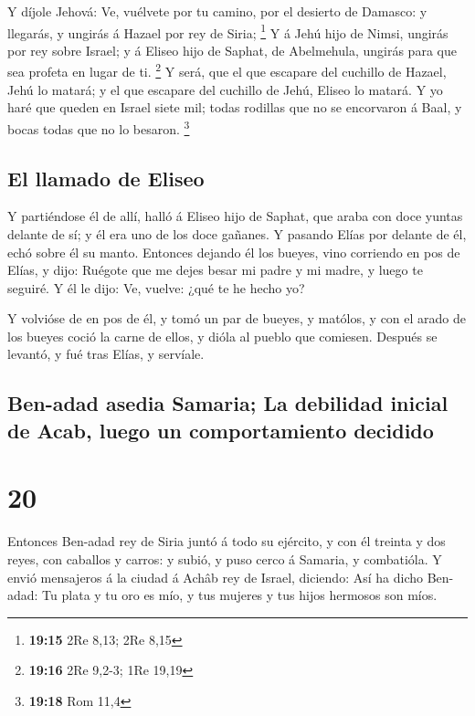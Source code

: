  Y díjole Jehová: Ve, vuélvete por tu camino, por el
desierto de Damasco: y llegarás, y ungirás á Hazael por rey de Siria;
\footnote{\textbf{19:15} 2Re 8,13; 2Re 8,15}  Y á Jehú
hijo de Nimsi, ungirás por rey sobre Israel; y á Eliseo hijo de Saphat,
de Abelmehula, ungirás para que sea profeta en lugar de ti. \footnote{\textbf{19:16}
  2Re 9,2-3; 1Re 19,19}  Y será, que el que escapare del
cuchillo de Hazael, Jehú lo matará; y el que escapare del cuchillo de
Jehú, Eliseo lo matará.  Y yo haré que queden en Israel
siete mil; todas rodillas que no se encorvaron á Baal, y bocas todas que
no lo besaron. \footnote{\textbf{19:18} Rom 11,4}

\hypertarget{el-llamado-de-eliseo}{%
\subsection{El llamado de Eliseo}\label{el-llamado-de-eliseo}}

 Y partiéndose él de allí, halló á Eliseo hijo de Saphat,
que araba con doce yuntas delante de sí; y él era uno de los doce
gañanes. Y pasando Elías por delante de él, echó sobre él su manto.
 Entonces dejando él los bueyes, vino corriendo en pos de
Elías, y dijo: Ruégote que me dejes besar mi padre y mi madre, y luego
te seguiré. Y él le dijo: Ve, vuelve: ¿qué te he hecho yo?

 Y volvióse de en pos de él, y tomó un par de bueyes, y
matólos, y con el arado de los bueyes coció la carne de ellos, y dióla
al pueblo que comiesen. Después se levantó, y fué tras Elías, y
servíale.

\hypertarget{ben-adad-asedia-samaria-la-debilidad-inicial-de-acab-luego-un-comportamiento-decidido}{%
\subsection{Ben-adad asedia Samaria; La debilidad inicial de Acab, luego
un comportamiento
decidido}\label{ben-adad-asedia-samaria-la-debilidad-inicial-de-acab-luego-un-comportamiento-decidido}}

\hypertarget{section-19}{%
\section{20}\label{section-19}}

 Entonces Ben-adad rey de Siria juntó á todo su ejército,
y con él treinta y dos reyes, con caballos y carros: y subió, y puso
cerco á Samaria, y combatióla.  Y envió mensajeros á la
ciudad á Achâb rey de Israel, diciendo:  Así ha dicho
Ben-adad: Tu plata y tu oro es mío, y tus mujeres y tus hijos hermosos
son míos.

